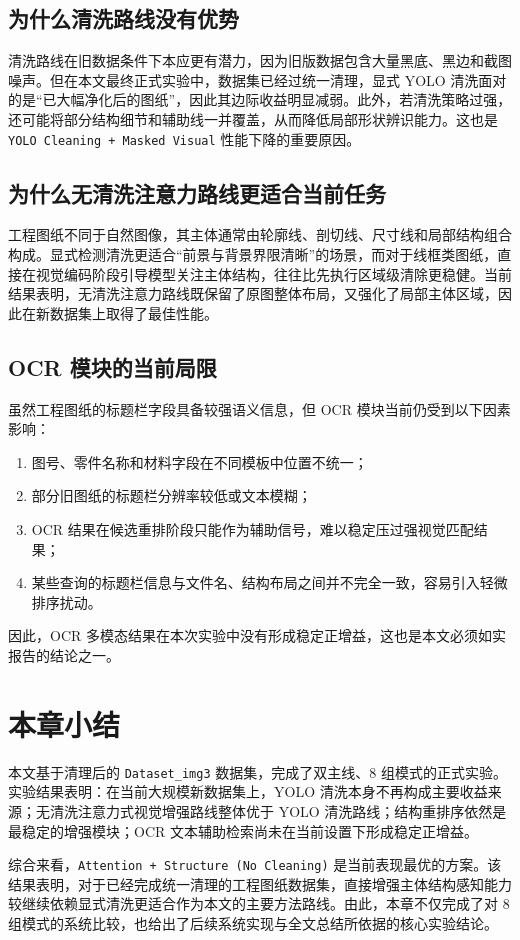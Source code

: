 \subsection{为什么清洗路线没有优势}

清洗路线在旧数据条件下本应更有潜力，因为旧版数据包含大量黑底、黑边和截图噪声。但在本文最终正式实验中，数据集已经过统一清理，显式 YOLO 清洗面对的是“已大幅净化后的图纸”，因此其边际收益明显减弱。此外，若清洗策略过强，还可能将部分结构细节和辅助线一并覆盖，从而降低局部形状辨识能力。这也是 \texttt{YOLO Cleaning + Masked Visual} 性能下降的重要原因。

\subsection{为什么无清洗注意力路线更适合当前任务}

工程图纸不同于自然图像，其主体通常由轮廓线、剖切线、尺寸线和局部结构组合构成。显式检测清洗更适合“前景与背景界限清晰”的场景，而对于线框类图纸，直接在视觉编码阶段引导模型关注主体结构，往往比先执行区域级清除更稳健。当前结果表明，无清洗注意力路线既保留了原图整体布局，又强化了局部主体区域，因此在新数据集上取得了最佳性能。

\subsection{OCR 模块的当前局限}

虽然工程图纸的标题栏字段具备较强语义信息，但 OCR 模块当前仍受到以下因素影响：
\begin{enumerate}
  \item 图号、零件名称和材料字段在不同模板中位置不统一；
  \item 部分旧图纸的标题栏分辨率较低或文本模糊；
  \item OCR 结果在候选重排阶段只能作为辅助信号，难以稳定压过强视觉匹配结果；
  \item 某些查询的标题栏信息与文件名、结构布局之间并不完全一致，容易引入轻微排序扰动。
\end{enumerate}

因此，OCR 多模态结果在本次实验中没有形成稳定正增益，这也是本文必须如实报告的结论之一。

\section{本章小结}

本文基于清理后的 \texttt{Dataset\_img3} 数据集，完成了双主线、8 组模式的正式实验。实验结果表明：在当前大规模新数据集上，YOLO 清洗本身不再构成主要收益来源；无清洗注意力式视觉增强路线整体优于 YOLO 清洗路线；结构重排序依然是最稳定的增强模块；OCR 文本辅助检索尚未在当前设置下形成稳定正增益。

综合来看，\texttt{Attention + Structure (No Cleaning)} 是当前表现最优的方案。该结果表明，对于已经完成统一清理的工程图纸数据集，直接增强主体结构感知能力较继续依赖显式清洗更适合作为本文的主要方法路线。由此，本章不仅完成了对 8 组模式的系统比较，也给出了后续系统实现与全文总结所依据的核心实验结论。
